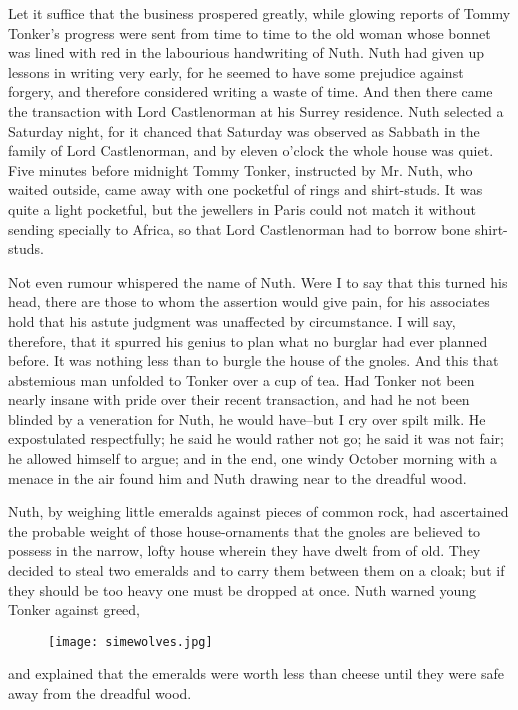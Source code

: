\documentclass[12pt]{article}
\begin{document}
Let it suffice that the business prospered greatly, while glowing
reports of Tommy Tonker's progress were sent from time to time to the
old woman whose bonnet was lined with red in the labourious
handwriting of Nuth. Nuth had given up lessons in writing very early,
for he seemed to have some prejudice against forgery, and therefore
considered writing a waste of time. And then there came the
transaction with Lord Castlenorman at his Surrey residence. Nuth
selected a Saturday night, for it chanced that Saturday was observed
as Sabbath in the family of Lord Castlenorman, and by eleven o'clock
the whole house was quiet. Five minutes before midnight Tommy Tonker,
instructed by Mr. Nuth, who waited outside, came away with one
pocketful of rings and shirt-studs. It was quite a light pocketful,
but the jewellers in Paris could not match it without sending
specially to Africa, so that Lord Castlenorman had to borrow bone
shirt-studs.

Not even rumour whispered the name of Nuth. Were I to say that this
turned his head, there are those to whom the assertion would give
pain, for his associates hold that his astute judgment was unaffected
by circumstance. I will say, therefore, that it spurred his genius to
plan what no burglar had ever planned before. It was nothing less than
to burgle the house of the gnoles. And this that abstemious man
unfolded to Tonker over a cup of tea. Had Tonker not been nearly
insane with pride over their recent transaction, and had he not been
blinded by a veneration for Nuth, he would have--but I cry over spilt
milk. He expostulated respectfully; he said he would rather not go; he
said it was not fair; he allowed himself to argue; and in the end, one
windy October morning with a menace in the air found him and Nuth
drawing near to the dreadful wood.

Nuth, by weighing little emeralds against pieces of common rock, had
ascertained the probable weight of those house-ornaments that the
gnoles are believed to possess in the narrow, lofty house wherein they
have dwelt from of old. They decided to steal two emeralds and to
carry them between them on a cloak; but if they should be too heavy
one must be dropped at once. Nuth warned young Tonker against greed,
\begin{figure}[!ht]
\begin{center}
\texttt{[image: simewolves.jpg]}
\end{center}
\end{figure}
and explained that the emeralds were worth less than cheese until they
were safe away from the dreadful wood.
\end{document}
